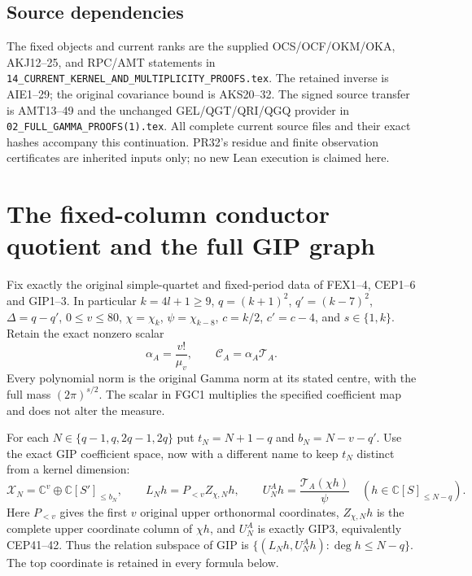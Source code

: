 \documentclass[11pt,a4paper]{article}
\begin{document}
\subsection*{Source dependencies}
The fixed objects and current ranks are the supplied OCS/OCF/OKM/OKA,
AKJ12--25, and RPC/AMT statements in \texttt{14\_CURRENT\_KERNEL\_AND\_MULTIPLICITY\_PROOFS.tex}.
The retained inverse is AIE1--29; the original covariance bound is
AKS20--32. The signed source transfer is AMT13--49 and the unchanged
GEL/QGT/QRI/QGQ provider in \texttt{02\_FULL\_GAMMA\_PROOFS(1).tex}.
All complete current source files and their exact hashes accompany this
continuation. PR32's residue and finite observation certificates are
inherited inputs only; no new Lean execution is claimed here.


\clearpage
\section{The fixed-column conductor quotient and the full GIP graph}
\label{sec:FGC-intake}

Fix exactly the original simple-quartet and fixed-period data of FEX1--4,
CEP1--6 and GIP1--3. In particular $k=4l+1\ge9$,
$q=(k+1)^2$, $q'=(k-7)^2$, $\Delta=q-q'$, $0\le v\le80$,
$\chi=\chi_k$, $\psi=\chi_{k-8}$, $c=k/2$, $c'=c-4$,
and $s\in\{1,k\}$. Retain the exact nonzero scalar
\[
 \alpha_A=\frac{v!}{\mu_v},\qquad
 \mathcal C_A=\alpha_A\mathcal T_A.
 \tag{FGC1}
\]
Every polynomial norm is the original Gamma norm at its stated centre,
with the full mass $(2\pi)^{s/2}$. The scalar in FGC1 multiplies the
specified coefficient map and does not alter the measure.

For each $N\in\{q-1,q,2q-1,2q\}$ put
$t_N=N+1-q$ and $b_N=N-v-q'$. Use the exact GIP coefficient space,
now with a different name to keep $t_N$ distinct from a kernel dimension:
\[
 \mathscr X_N=\mathbb C^v\oplus\mathbb C[S']_{\le b_N},\qquad
 L_Nh=P_{<v}Z_{\chi,N}h,\qquad
 U_N^Ah=\frac{\mathcal T_A(\chi h)}{\psi}
 \quad(h\in\mathbb C[S]_{\le N-q}).
 \tag{FGC2}
\]
Here $P_{<v}$ gives the first $v$ original upper orthonormal coordinates,
$Z_{\chi,N}h$ is the complete upper coordinate column of $\chi h$,
and $U_N^A$ is exactly GIP3, equivalently CEP41--42. Thus the relation
subspace of GIP is $\{(L_Nh,U_N^Ah):\deg h\le N-q\}$.
The top coordinate is retained in every formula below.
\end{document}
